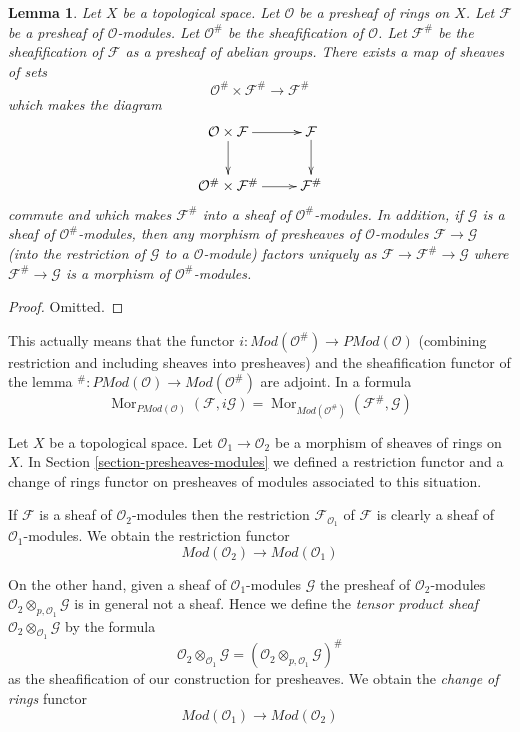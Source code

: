 \documentclass{stacks-project}
\theoremstyle{plain}
\newtheorem{lemma}[subsection]{Lemma}
\theoremstyle{definition}
\theoremstyle{remark}
\numberwithin{equation}{subsection}
\def\Mor{\mathop{\mathrm{Mor}}\nolimits}
\begin{document}
\begin{lemma}
\label{lemma-sheafification-presheaf-modules}
Let $X$ be a topological space.
Let $\mathcal{O}$ be a presheaf of rings on $X$.
Let $\mathcal{F}$ be a presheaf of $\mathcal{O}$-modules.
Let $\mathcal{O}^\#$ be the sheafification of $\mathcal{O}$.
Let $\mathcal{F}^\#$ be the sheafification of $\mathcal{F}$
as a presheaf of abelian groups. There exists a map of
sheaves of sets
$$
\mathcal{O}^\# \times \mathcal{F}^\#
\longrightarrow
\mathcal{F}^\#
$$
which makes the diagram
$$
\xymatrix{
\mathcal{O} \times \mathcal{F} \ar[r] \ar[d] &
\mathcal{F} \ar[d] \\
\mathcal{O}^\# \times \mathcal{F}^\# \ar[r] &
\mathcal{F}^\#
}
$$
commute and which makes $\mathcal{F}^\#$ into a sheaf
of $\mathcal{O}^\#$-modules. In addition, if $\mathcal{G}$
is a sheaf of $\mathcal{O}^\#$-modules, then any morphism
of presheaves of $\mathcal{O}$-modules $\mathcal{F} \to \mathcal{G}$
(into the restriction of $\mathcal{G}$ to a $\mathcal{O}$-module)
factors uniquely as $\mathcal{F} \to \mathcal{F}^\# \to \mathcal{G}$
where $\mathcal{F}^\# \to \mathcal{G}$ is a morphism of
$\mathcal{O}^\#$-modules.
\end{lemma}

\begin{proof}
Omitted.
\end{proof}

\noindent
This actually means that the functor
$i : \textit{Mod}(\mathcal{O}^\#) \to \textit{PMod}(\mathcal{O})$
(combining restriction and including sheaves into presheaves)
and the sheafification functor of the lemma
${}^\# : \textit{PMod}(\mathcal{O}) \to \textit{Mod}(\mathcal{O}^\#)$
are adjoint. In a formula
$$
\Mor_{\textit{PMod}(\mathcal{O})}(\mathcal{F}, i\mathcal{G})
=
\Mor_{\textit{Mod}(\mathcal{O}^\#)}(\mathcal{F}^\#, \mathcal{G})
$$

\medskip\noindent
Let $X$ be a topological space.
Let $\mathcal{O}_1 \to \mathcal{O}_2$ be
a morphism of sheaves of rings on $X$.
In Section \ref{section-presheaves-modules}
we defined a restriction functor
and a change of rings functor on presheaves of modules
associated to this situation.

\medskip\noindent
If $\mathcal{F}$ is a sheaf of $\mathcal{O}_2$-modules
then the restriction $\mathcal{F}_{\mathcal{O}_1}$
of $\mathcal{F}$ is clearly a sheaf
of $\mathcal{O}_1$-modules. We obtain the restriction functor
$$
\textit{Mod}(\mathcal{O}_2)
\longrightarrow
\textit{Mod}(\mathcal{O}_1)
$$

\medskip\noindent
On the other hand, given a sheaf of $\mathcal{O}_1$-modules
$\mathcal{G}$ the presheaf of $\mathcal{O}_2$-modules
$\mathcal{O}_2 \otimes_{p, \mathcal{O}_1} \mathcal{G}$
is in general not a sheaf. Hence we define the
{\it tensor product sheaf}
$\mathcal{O}_2 \otimes_{\mathcal{O}_1} \mathcal{G}$
by the formula
$$
\mathcal{O}_2 \otimes_{\mathcal{O}_1} \mathcal{G}
=
(\mathcal{O}_2 \otimes_{p, \mathcal{O}_1} \mathcal{G})^\#
$$
as the sheafification of our construction for presheaves.
We obtain the {\it change of rings} functor
$$
\textit{Mod}(\mathcal{O}_1)
\longrightarrow
\textit{Mod}(\mathcal{O}_2)
$$
\end{document}
